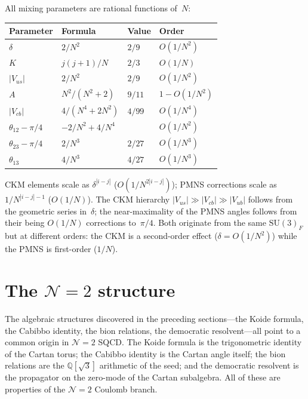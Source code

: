 \documentclass[aps,prd,twocolumn,showpacs,preprintnumbers,superscriptaddress]{revtex4-2}
\newcommand{\SU}{\mathrm{SU}}
\begin{document}
All mixing parameters are rational functions of~$N$:
\begin{center}
\begin{tabular}{llll}
\toprule
Parameter & Formula & Value & Order \\
\midrule
$\delta$ & $2/N^2$ & $2/9$ & $O(1/N^2)$ \\
$K$ & $j(j{+}1)/N$ & $2/3$ & $O(1/N)$ \\
$|V_{us}|$ & $2/N^2$ & $2/9$ & $O(1/N^2)$ \\
$A$ & $N^2/(N^2{+}2)$ & $9/11$ & $1{-}O(1/N^2)$ \\
$|V_{cb}|$ & $4/(N^4{+}2N^2)$ & $4/99$ & $O(1/N^4)$ \\
$\theta_{12}{-}\pi/4$ & $-2/N^2{+}4/N^4$ & & $O(1/N^2)$ \\
$\theta_{23}{-}\pi/4$ & $2/N^3$ & $2/27$ & $O(1/N^3)$ \\
$\theta_{13}$ & $4/N^3$ & $4/27$ & $O(1/N^3)$ \\
\bottomrule
\end{tabular}
\end{center}

CKM elements scale as $\delta^{|i-j|}$ ($O(1/N^{2|i-j|})$);
PMNS corrections scale as $1/N^{|i-j|-1}$ ($O(1/N)$).
The CKM hierarchy $|V_{us}| \gg |V_{cb}| \gg |V_{ub}|$
follows from the geometric series in~$\delta$;
the near-maximality of the PMNS angles follows from
their being $O(1/N)$ corrections to~$\pi/4$.
Both originate from the same $\SU(3)_F$ but at different
orders: the CKM is a second-order effect ($\delta = O(1/N^2)$)
while the PMNS is first-order ($1/N$).

\section{The $\mathcal{N}{=}2$ structure}
\label{sec:N2}

The algebraic structures discovered in the preceding
sections---the Koide formula, the Cabibbo identity, the
bion relations, the democratic resolvent---all point to a
common origin in $\mathcal{N}{=}2$ SQCD.
The Koide formula is the trigonometric identity of the
Cartan torus; the Cabibbo identity is the Cartan angle
itself; the bion relations are the $\mathbb{Q}[\sqrt{3}]$
arithmetic of the seed; and the democratic resolvent is
the propagator on the zero-mode of the Cartan subalgebra.
All of these are properties of the $\mathcal{N}{=}2$
Coulomb branch.
\end{document}
